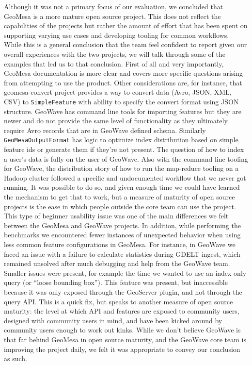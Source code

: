 Although it was not a primary focus of our evaluation, we concluded that GeoMesa is a more mature open source project.
This does not reflect the capabilities of the projects but rather the amount of effort that has been spent on supporting varying use cases and developing tooling for common workflows.
While this is a general conclusion that the team feel confident to report given our overall experiences with the two projects, we will talk through some of the examples that led us to that conclusion.
First of all and very importantly, GeoMesa documentation is more clear and covers more specific questions arising from attempting to use the product.
Other considerations are, for instance, that geomesa-convert project provides a way to convert data (Avro, JSON, XML, CSV) to \texttt{SimpleFeature} with ability to specify the convert format using JSON structure.
GeoWave has command line tools for importing features but they are newer and do not provide the same level of functionality as they ultimately require Avro records that are in GeoWave defined schema.
Similarly \texttt{GeoMesaOutputFormat} has logic to optimize index distribution based on simple feature ids or generate them if they're not present.
The question of how to index a user’s data is fully on the user of GeoWave.
Also with the command line tooling for GeoWave, the distribution story of how to run the map-reduce tooling on a Hadoop cluster followed a specific and undocumented workflow that we never got running.
It was possible to do so, and given enough time we could have learned the mechanism to get that to work, but a measure of maturity of open source projects is the ease in which people outside the core team can use the project.
This type of beginner usability issue was one of the main differences we felt between the GeoMesa and GeoWave projects.
In addition, while performing the benchmarks we encountered fewer instances of unexpected behavior when using less common feature configurations in GeoMesa.
For instance, in GeoWave we faced an issue with a failure to calculate statistics during GDELT ingest, which remained unsolved after much debugging and help from the GeoWave team.
Smaller issues were present, for example the time we wanted to use an index-only query (or “loose bounding box”).
This feature was present, but inaccessible because it was only exposed through the GeoServer plugin, and not through the query API.
This is a quick fix, but speaks to another measure of open source maturity: the level at which API and features are exposed to community users, designed with community users in mind, and have been kicked around by community users enough to work out kinks.
While we don’t believe GeoWave is that far behind GeoMesa in open source maturity, and the GeoWave core team is improving the project daily, we felt it was appropriate to convey our conclusion as such.

